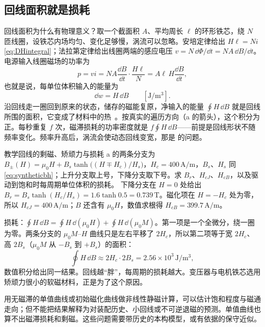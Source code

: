\subsection{回线面积就是损耗}
回线面积为什么有物理意义？取一个截面积 $A$、平均周长 $\ell$ 的环形铁芯，绕 $N$ 匝线圈，设铁芯内场均匀、变化足够慢，涡流可以忽略。安培定律给出 $H\ell=Ni$ \eqref{eq:DHintegral}；法拉第定律给出线圈两端的感应电压 $v=N\,\dd\Phi/\dd t=NA\,\dd B/\dd t$。电源输入线圈磁场的功率为
\begin{equation*}
p=vi=NA\frac{\dd B}{\dd t}\cdot\frac{H\ell}{N}=A\ell\,H\frac{\dd B}{\dd t},
\end{equation*}
也就是说，每单位体积输入的能量为
\begin{equation}
\dd w=H\,\dd B\qquad[\mathrm{J/m^3}].
\label{eq:bh-work}
\end{equation}
沿回线走一圈回到原来的状态，储存的磁能复原，净输入的能量 $\oint H\,\dd B$ 就是回线所围的面积，它变成了材料中的热~\cite{fitzgerald}。按真实的遍历方向（a 的箭头），这个积分为正。每秒重复 $f$ 次，磁滞损耗的功率密度就是 $f\oint H\,\dd B$——前提是回线形状不随频率变化。频率升高后，涡流会使动态回线变宽，那是 的问题。

\begin{example}[label=ex:bh-loss]{教学回线的剩磁、矫顽力与损耗}
a 的两条分支为 $B_\pm(H)=\mu_0H+B_s\tanh\bigl((H\mp H_c)/H_s\bigr)$，$H_c=400\,\mathrm{A/m}$，$B_s$、$H_s$ 同 \eqref{eq:syntheticbh}；上升分支取上号，下降分支取下号。求 $B_r$、$H_{cJ}$、$H_{cB}$，以及驱动到饱和时每周期单位体积的损耗。
\solution
下降分支在 $H=0$ 处给出 $B_r=B_s\tanh(H_c/H_s)=1.6\tanh0.5=0.739\,\mathrm T$。磁化项在 $H=-H_c$ 处为零，所以 $H_{cJ}=400\,\mathrm{A/m}$；$B$ 还含有 $\mu_0H$，数值求根得 $H_{cB}=399.7\,\mathrm{A/m}$。

损耗：$\oint H\,\dd B=\oint H\,\dd(\mu_0H)+\oint H\,\dd(\mu_0M)$。第一项是一个全微分，绕一圈为零。两条分支的 $\mu_0M$--$H$ 曲线只是左右平移了 $2H_c$，所以第二项等于宽 $2H_c$、高 $2B_s$（$\mu_0M$ 从 $-B_s$ 到 $+B_s$）的面积：
\begin{equation*}
\oint H\,\dd B\approx2H_c\cdot2B_s=2.56\times10^3\,\mathrm{J/m^3},
\end{equation*}
数值积分给出同一结果。回线越“胖”，每周期的损耗越大。变压器与电机铁芯选用矫顽力很小的软磁材料，正是为了这个原因。
\end{example}

用无磁滞的单值曲线或初始磁化曲线做非线性静磁计算，可以估计饱和程度与磁通走向；但不能把结果解释为对装配历史、小回线或不可逆退磁的预测。单值曲线也算不出磁滞损耗和剩磁。这些问题需要带历史的本构模型，或有依据的保守近似。

